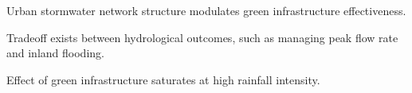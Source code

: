 \documentclass[draft]{agujournal2019}
\begin{document}


\begin{keypoints}
\item Urban stormwater network structure modulates green infrastructure effectiveness.
\item Tradeoff exists between hydrological outcomes, such as managing peak flow rate and inland flooding.
\item Effect of green infrastructure saturates at high rainfall intensity. 
\end{keypoints}

%
%

%
%

\end{document}
